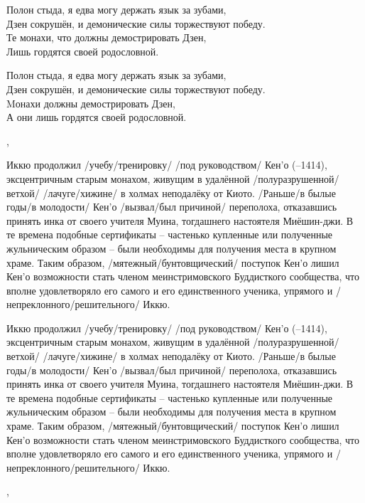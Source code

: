 \begin{ver}[1]
\begin{verses}
  Полон стыда, я едва могу держать язык за зубами,\\
  Дзен сокрушён, и демонические силы торжествуют победу.\\
  Те монахи, что должны демострировать Дзен,\\
  Лишь гордятся своей родословной.
\end{verses}
\end{ver}

\begin{ver}[1]
\begin{verses}
  Полон стыда, я едва могу держать язык за зубами,\\
  Дзен сокрушён, и демонические силы торжествуют победу.\\
  Mонахи должны демострировать Дзен,\\
  А они лишь гордятся своей родословной.
\end{verses}
\end{ver}
\sep   

\begin{ver}
Иккю продолжил /учебу/тренировку/ /под руководством/ Кен'о (--1414),
эксцентричным старым монахом, живущим в удалённой
/полуразрушенной/ветхой/ /лачуге/хижине/ в холмах неподалёку от Киото.
/Раньше/в былые годы/в молодости/ Кен'о
/вызвал/был причиной/ переполоха, отказавшись принять инка от своего
учителя Муина, тогдашнего настоятеля Миёшин-джи. В те времена подобные сертификаты --
частенько купленные или полученные жульническим образом -- были
необходимы для получения места в крупном храме. Таким образом,
/мятежный/бунтовщический/ поступок Кен'о лишил Кен'о возможности стать
членом меинстримовского Буддисткого сообщества, что вполне
удовлетворяло его самого и его единственного ученика, упрямого и
/непреклонного/решительного/ Иккю.
\end{ver}

\begin{ver}[1]
Иккю продолжил /учебу/тренировку/ /под руководством/ Кен'о (--1414),
эксцентричным старым монахом, живущим в удалённой
/полуразрушенной/ветхой/ /лачуге/хижине/ в холмах неподалёку от Киото.
/Раньше/в былые годы/в молодости/ Кен'о
/вызвал/был причиной/ переполоха, отказавшись принять инка от своего
учителя Муина, тогдашнего настоятеля Миёшин-джи. В те времена подобные сертификаты --
частенько купленные или полученные жульническим образом -- были
необходимы для получения места в крупном храме. Таким образом,
/мятежный/бунтовщический/ поступок Кен'о лишил Кен'о возможности стать
членом меинстримовского Буддисткого сообщества, что вполне
удовлетворяло его самого и его единственного ученика, упрямого и
/непреклонного/решительного/ Иккю.

\end{ver}
\sep

